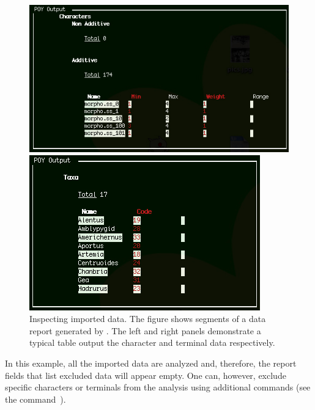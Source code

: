 \begin{figure}
\centering
\begin{minipage}[c]{0.52\textwidth}
   		\includegraphics[width=\textwidth]{figures/report2.jpg}
\end{minipage}
\quad
\begin{minipage}[c]{0.44\textwidth}
	   	\includegraphics[width=\textwidth]{figures/report3.jpg}
   	\end{minipage}
\caption{Inspecting imported data. The figure shows segments of a data report generated by . The left and right panels demonstrate a typical table output the character and terminal data respectively.}
\label{fig:reportdata}
\end{figure}

In this example, all the imported data are analyzed and, therefore, the report fields that list excluded data will appear empty. One can, however, exclude specific characters or terminals from the analysis using additional commands (see the command~).

